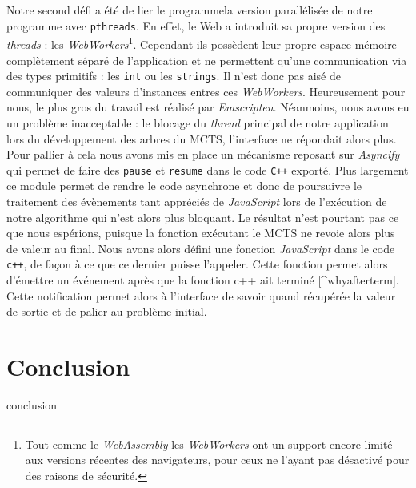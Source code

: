 \documentclass[a4paper,11pt]{article}
\begin{document}
Notre second défi a été de lier le programmela version parallélisée de
notre programme avec \texttt{pthreads}\citep{pthreads_emscripten}. En
effet, le Web a introduit sa propre version des \emph{threads} : les
\emph{WebWorkers}\footnote{Tout comme le \emph{WebAssembly} les
  \emph{WebWorkers} ont un support encore limité aux versions récentes
  des navigateurs, pour ceux ne l'ayant pas désactivé pour des raisons
  de sécurité.}. Cependant ils possèdent leur propre espace mémoire
complètement séparé de l'application et ne permettent qu'une
communication via des types primitifs : les \texttt{int} ou les
\texttt{strings}. Il n'est donc pas aisé de communiquer des valeurs
d'instances entres ces \emph{WebWorkers}. Heureusement pour nous, le
plus gros du travail est réalisé par \emph{Emscripten}. Néanmoins, nous
avons eu un problème inacceptable : le blocage du \emph{thread}
principal de notre application lors du développement des arbres du MCTS,
l'interface ne répondait alors plus. Pour pallier à cela nous avons mis
en place un mécanisme reposant sur \emph{Asyncify} \citep{asyncify} qui
permet de faire des \texttt{pause} et \texttt{resume} dans le code
\texttt{C++} exporté. Plus largement ce module permet de rendre le code
asynchrone et donc de poursuivre le traitement des évènements tant
appréciés de \emph{JavaScript} lors de l'exécution de notre algorithme
qui n'est alors plus bloquant. Le résultat n'est pourtant pas ce que
nous espérions, puisque la fonction exécutant le MCTS ne revoie alors
plus de valeur au final. Nous avons alors défini une fonction
\emph{JavaScript} dans le code \texttt{c++}, de façon à ce que ce
dernier puisse l'appeler. Cette fonction permet alors d'émettre un
événement après que la fonction c++ ait terminé {[}\^{}whyafterterm{]}.
Cette notification permet alors à l'interface de savoir quand récupérée
la valeur de sortie et de palier au problème initial.

\hypertarget{conclusion}{%
\section{Conclusion}\label{conclusion}}

conclusion

% 

\end{document}

